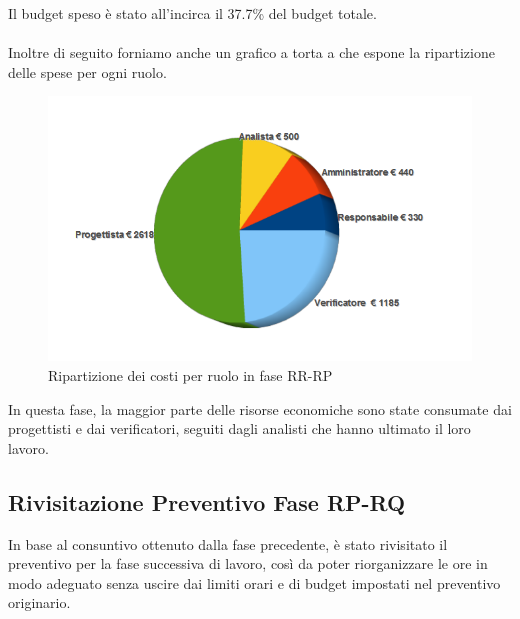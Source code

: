 Il budget speso \`e stato all'incirca il 37.7\% del budget totale.\\
\\
Inoltre di seguito forniamo anche un grafico a torta a che espone la
ripartizione delle spese per ogni ruolo.

\vspace{0cm}
\begin{figure}[htbp!]
  \centering
  \includegraphics[width=13cm, angle=0]{img/PP/COSTI-RP.png}
\caption{Ripartizione dei costi per ruolo in fase RR-RP}
\end{figure}
\vspace{0.5cm}

In questa fase, la maggior parte delle risorse economiche sono state consumate
dai progettisti e dai verificatori, seguiti dagli analisti che hanno ultimato il
loro lavoro.

\newpage
\subsection{Rivisitazione Preventivo Fase RP-RQ}

In base al consuntivo ottenuto dalla fase precedente, \`e stato rivisitato il
preventivo per la fase successiva di lavoro, cos\`i da poter riorganizzare le
ore in modo adeguato senza uscire dai limiti orari e di budget impostati nel
preventivo originario.


